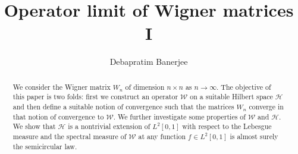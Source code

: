 \documentclass[reqno,12pt]{amsart}
\title{Operator limit of Wigner matrices I}
\author{Debapratim Banerjee}
\theoremstyle{plain}
\theoremstyle{definition}
\begin{document}
\maketitle
\begin{abstract}
    We consider the Wigner matrix $W_{n}$ of dimension $n \times n$ as $n \to \infty$. The objective of this paper is two folds: first we construct an operator $\mathcal{W}$ on a suitable Hilbert space $\mathcal{H}$ and then define a suitable notion of convergence such that the matrices $W_{n}$ converge in that notion of convergence to $\mathcal{W}$. We further investigate some properties of $\mathcal{W}$ and $\mathcal{H}$. We show that $\mathcal{H}$ is a nontrivial extension of $L^{2}[0,1]$ with respect to the Lebesgue measure and the spectral measure of $\mathcal{W}$ at any function $f \in L^{2}[0,1]$ is almost surely the semicircular law.
\end{abstract}
\end{document}
